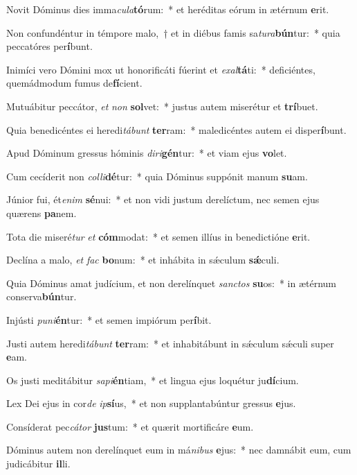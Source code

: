 \item Novit Dóminus dies imma\textit{cu}\textit{la}\textbf{tó}rum:~* et heréditas eórum in ætérnum \textbf{e}rit.
\item Non confundéntur in témpore malo,~† et in diébus famis sa\textit{tu}\textit{ra}\textbf{bún}tur:~* quia peccatóres per\textbf{í}bunt.
\item Inimíci vero Dómini mox ut honorificáti fúerint et \textit{ex}\textit{al}\textbf{tá}ti:~* deficiéntes, quemádmodum fumus de\textbf{fí}cient.
\item Mutuábitur peccátor, \textit{et} \textit{non} \textbf{sol}vet:~* justus autem miserétur et \textbf{trí}buet.
\item Quia benedicéntes ei heredi\textit{tá}\textit{bunt} \textbf{ter}ram:~* maledicéntes autem ei disper\textbf{í}bunt.
\item Apud Dóminum gressus hóminis \textit{di}\textit{ri}\textbf{gén}tur:~* et viam ejus \textbf{vo}let.
\item Cum cecíderit non \textit{col}\textit{li}\textbf{dé}tur:~* quia Dóminus suppónit manum \textbf{su}am.
\item Júnior fui, ét\textit{e}\textit{nim} \textbf{sé}nui:~* et non vidi justum derelíctum, nec semen ejus quærens \textbf{pa}nem.
\item Tota die miseré\textit{tur} \textit{et} \textbf{cóm}modat:~* et semen illíus in benedictióne \textbf{e}rit.
\item Declína a malo, \textit{et} \textit{fac} \textbf{bo}num:~* et inhábita in sǽculum \textbf{sǽ}culi.
\item Quia Dóminus amat judícium, et non derelínquet \textit{sanc}\textit{tos} \textbf{su}os:~* in ætérnum conserva\textbf{bún}tur.
\item Injústi \textit{pu}\textit{ni}\textbf{én}tur:~* et semen impiórum per\textbf{í}bit.
\item Justi autem heredi\textit{tá}\textit{bunt} \textbf{ter}ram:~* et inhabitábunt in sǽculum sǽculi super \textbf{e}am.
\item Os justi meditábitur \textit{sa}\textit{pi}\textbf{én}tiam,~* et lingua ejus loquétur ju\textbf{dí}cium.
\item Lex Dei ejus in cor\textit{de} \textit{ip}\textbf{sí}us,~* et non supplantabúntur gressus \textbf{e}jus.
\item Consíderat pec\textit{cá}\textit{tor} \textbf{jus}tum:~* et quærit mortificáre \textbf{e}um.
\item Dóminus autem non derelínquet eum in má\textit{ni}\textit{bus} \textbf{e}jus:~* nec damnábit eum, cum judicábitur \textbf{il}li.
